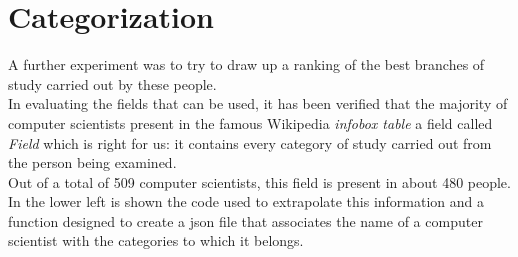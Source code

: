 \documentclass[12pt, twoside]{article}
\begin{document}
\section{Categorization}
A further experiment was to try to draw up a ranking of the best branches of study carried out by these people.\\
In evaluating the fields that can be used, it has been verified that the majority of computer scientists present in the famous Wikipedia \textit{infobox table} a field called \textit{Field} which is right for us: it contains every category of study carried out from the person being examined.\\
Out of a total of 509 computer scientists, this field is present in about 480 people. \\
In the lower left is shown the code used to extrapolate this information and a function designed to create a json file that associates the name of a computer scientist with the categories to which it belongs.
\end{document}
